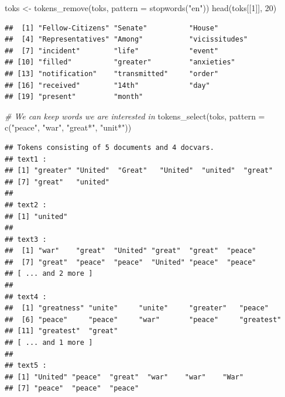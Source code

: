 \documentclass[
  12pt,
]{style/krantz}
\newenvironment{Shaded}{\begin{snugshade}}{\end{snugshade}}
\newcommand{\AttributeTok}[1]{\textcolor[rgb]{0.77,0.63,0.00}{#1}}
\newcommand{\CommentTok}[1]{\textcolor[rgb]{0.56,0.35,0.01}{\textit{#1}}}
\newcommand{\DecValTok}[1]{\textcolor[rgb]{0.00,0.00,0.81}{#1}}
\newcommand{\FunctionTok}[1]{\textcolor[rgb]{0.00,0.00,0.00}{#1}}
\newcommand{\NormalTok}[1]{#1}
\newcommand{\OtherTok}[1]{\textcolor[rgb]{0.56,0.35,0.01}{#1}}
\newcommand{\StringTok}[1]{\textcolor[rgb]{0.31,0.60,0.02}{#1}}
\begin{document}
\begin{Shaded}
\begin{Highlighting}[]
\NormalTok{toks }\OtherTok{\textless{}{-}} \FunctionTok{tokens\_remove}\NormalTok{(toks, }\AttributeTok{pattern =} \FunctionTok{stopwords}\NormalTok{(}\StringTok{"en"}\NormalTok{))}
\FunctionTok{head}\NormalTok{(toks[[}\DecValTok{1}\NormalTok{]], }\DecValTok{20}\NormalTok{)}
\end{Highlighting}
\end{Shaded}

\begin{verbatim}
##  [1] "Fellow-Citizens" "Senate"          "House"          
##  [4] "Representatives" "Among"           "vicissitudes"   
##  [7] "incident"        "life"            "event"          
## [10] "filled"          "greater"         "anxieties"      
## [13] "notification"    "transmitted"     "order"          
## [16] "received"        "14th"            "day"            
## [19] "present"         "month"
\end{verbatim}

\begin{Shaded}
\begin{Highlighting}[]
\CommentTok{\# We can keep words we are interested in}
\FunctionTok{tokens\_select}\NormalTok{(toks, }\AttributeTok{pattern =} \FunctionTok{c}\NormalTok{(}\StringTok{"peace"}\NormalTok{, }\StringTok{"war"}\NormalTok{, }\StringTok{"great*"}\NormalTok{, }\StringTok{"unit*"}\NormalTok{))}
\end{Highlighting}
\end{Shaded}

\begin{verbatim}
## Tokens consisting of 5 documents and 4 docvars.
## text1 :
## [1] "greater" "United"  "Great"   "United"  "united"  "great"  
## [7] "great"   "united" 
## 
## text2 :
## [1] "united"
## 
## text3 :
##  [1] "war"    "great"  "United" "great"  "great"  "peace" 
##  [7] "great"  "peace"  "peace"  "United" "peace"  "peace" 
## [ ... and 2 more ]
## 
## text4 :
##  [1] "greatness" "unite"     "unite"     "greater"   "peace"    
##  [6] "peace"     "peace"     "war"       "peace"     "greatest" 
## [11] "greatest"  "great"    
## [ ... and 1 more ]
## 
## text5 :
## [1] "United" "peace"  "great"  "war"    "war"    "War"   
## [7] "peace"  "peace"  "peace"
\end{verbatim}
\end{document}
